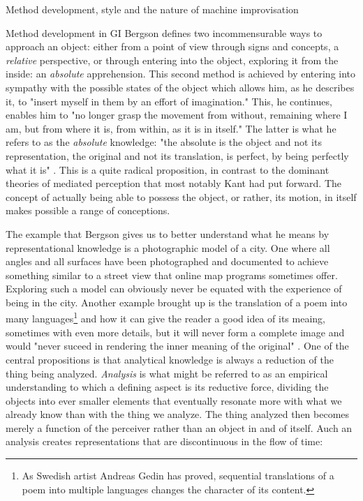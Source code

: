 \documentclass[presentation]{beamer}
\begin{document}
\begin{frame}[label={sec:org08c5441}]{Method development, style and the nature of machine improvisation}
\begin{block}{Method development in GI}
Bergson defines two incommensurable ways to approach an object: either from a point of view through signs and concepts, a \emph{relative} perspective, or through entering into the object, exploring it from the inside: an \emph{absolute} apprehension. This second method is achieved by entering into sympathy with the possible states of the object which allows him, as he describes it, to "insert myself in them by an effort of imagination." \citep[p. 2]{Bergson1912} This, he continues, enables him to "no longer grasp the movement from without, remaining where I am, but from where it is, from within, as it is in itself." \citep[p. 3]{Bergson1912} The latter is what he refers to as the \emph{absolute} knowledge: "the absolute is the object and not its representation, the original and not its translation, is perfect, by being perfectly what it is" \citep[p. 5-6]{Bergson1912}. This is a quite radical proposition, in contrast to the dominant theories of mediated perception that most notably Kant had put forward. The concept of actually being able to possess the object, or rather, its motion, in itself makes possible a range of conceptions.

The example that Bergson gives us to better understand what he means by representational knowledge is a photographic model of a city. One where all angles and all surfaces have been photographed and documented to achieve something similar to a street view that online map programs sometimes offer. Exploring such a model can obviously  never be equated with the experience of being in the city. Another example brought up is the translation of a poem into many languages\footnote{As Swedish artist Andreas Gedin has proved, sequential translations of a poem into multiple languages changes the character of its content.} and how it can give the reader a good idea of its meaing, sometimes with even more details, but it will never form a complete image and would "never suceed in rendering the inner meaning of the original" \citep[p. 5]{Bergson1912}. One of the central propositions is that analytical knowledge is always a reduction of the thing being analyzed. \emph{Analysis} is what might be referred to as an empirical understanding to which a defining aspect is its reductive force, dividing the objects into ever smaller elements that eventually resonate more with what we already know than with the thing we analyze. The thing analyzed then becomes merely a function of the perceiver rather than an object in and of itself. Auch an analysis creates representations that are discontinuous in the flow of time:


\end{block}
\end{frame}
\end{document}
